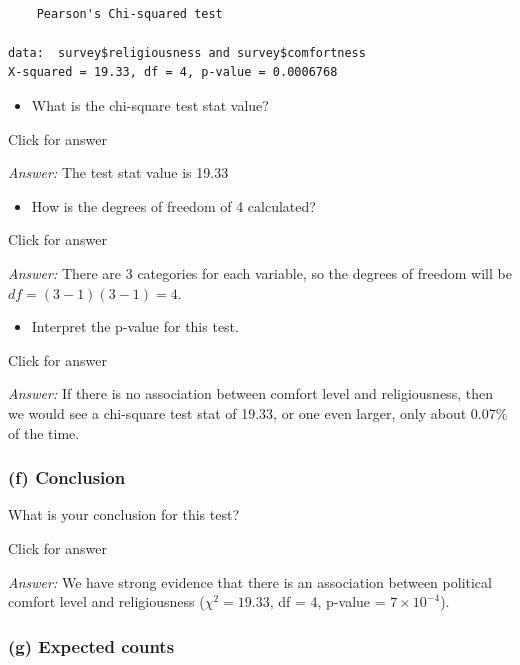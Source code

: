 \documentclass[
]{book}
\providecommand{\tightlist}{%
  \setlength{\itemsep}{0pt}\setlength{\parskip}{0pt}}
\begin{document}
\begin{verbatim}

    Pearson's Chi-squared test

data:  survey$religiousness and survey$comfortness
X-squared = 19.33, df = 4, p-value = 0.0006768
\end{verbatim}

\begin{itemize}
\tightlist
\item
  What is the chi-square test stat value?
\end{itemize}

Click for answer

\emph{Answer:} The test stat value is 19.33

\begin{itemize}
\tightlist
\item
  How is the degrees of freedom of 4 calculated?
\end{itemize}

Click for answer

\emph{Answer:} There are 3 categories for each variable, so the degrees of freedom will be \(df = (3-1)(3-1) = 4\).

\begin{itemize}
\tightlist
\item
  Interpret the p-value for this test.
\end{itemize}

Click for answer

\emph{Answer:} If there is no association between comfort level and religiousness, then we would see a chi-square test stat of 19.33, or one even larger, only about 0.07\% of the time.

\hypertarget{f-conclusion}{%
\subsubsection{(f) Conclusion}\label{f-conclusion}}

What is your conclusion for this test?

Click for answer

\emph{Answer:} We have strong evidence that there is an association between political comfort level and religiousness (\(\chi^2 = 19.33\), df = 4, p-value = \ensuremath{7\times 10^{-4}}).

\hypertarget{g-expected-counts}{%
\subsubsection{(g) Expected counts}\label{g-expected-counts}}
\end{document}
